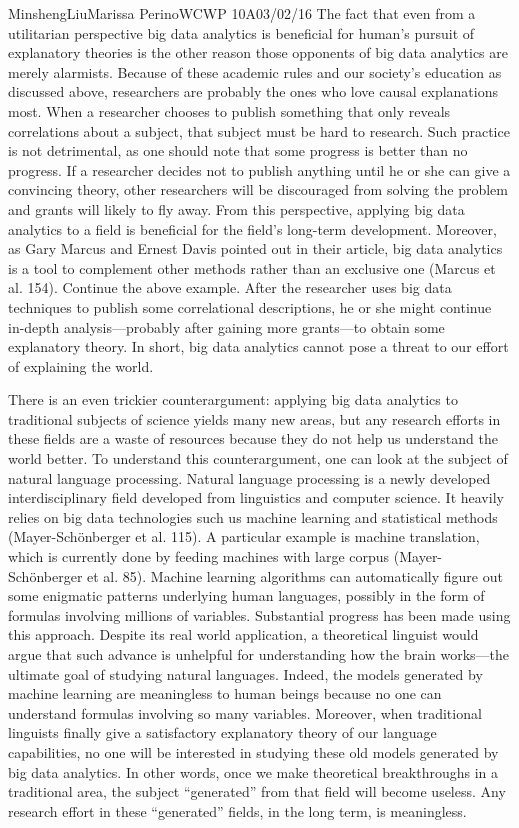 \documentclass[12pt,letterpaper]{article}
\begin{document}
\begin{mla}{Minsheng}{Liu}{Marissa Perino}{WCWP 10A}{03/02/16}
The fact that even from a utilitarian perspective big data analytics is
beneficial for human's pursuit of explanatory theories is the other
reason those opponents of big data analytics are merely alarmists.
Because of these academic rules and our society's education as discussed
above, researchers are probably the ones who love causal explanations
most. When a researcher chooses to publish something that only reveals
correlations about a subject, that subject must be hard to research.
Such practice is not detrimental, as one should note that some progress
is better than no progress. If a researcher decides not to publish
anything until he or she can give a convincing theory, other researchers
will be discouraged from solving the problem and grants will likely to
fly away. From this perspective, applying big data analytics to a field
is beneficial for the field's long-term development. Moreover, as Gary
Marcus and Ernest Davis pointed out in their article, big data analytics
is a tool to complement other methods rather than an exclusive one
(Marcus et al. 154). Continue the above example. After the researcher
uses big data techniques to publish some correlational descriptions, he
or she might continue in-depth analysis---probably after gaining more
grants---to obtain some explanatory theory. In short, big data analytics
cannot pose a threat to our effort of explaining the world.

There is an even trickier counterargument: applying big data analytics
to traditional subjects of science yields many new areas, but any
research efforts in these fields are a waste of resources because they
do not help us understand the world better. To understand this
counterargument, one can look at the subject of natural language
processing. Natural language processing is a newly developed
interdisciplinary field developed from linguistics and computer science.
It heavily relies on big data technologies such us machine learning and
statistical methods (Mayer-Schönberger et al. 115). A particular example
is machine translation, which is currently done by feeding machines with
large corpus (Mayer-Schönberger et al. 85). Machine learning algorithms
can automatically figure out some enigmatic patterns underlying human
languages, possibly in the form of formulas involving millions of
variables. Substantial progress has been made using this approach.
Despite its real world application, a theoretical linguist would argue
that such advance is unhelpful for understanding how the brain
works---the ultimate goal of studying natural languages. Indeed, the
models generated by machine learning are meaningless to human beings
because no one can understand formulas involving so many variables.
Moreover, when traditional linguists finally give a satisfactory
explanatory theory of our language capabilities, no one will be
interested in studying these old models generated by big data analytics.
In other words, once we make theoretical breakthroughs in a traditional
area, the subject ``generated'' from that field will become useless. Any
research effort in these ``generated'' fields, in the long term, is
meaningless.


\end{mla}
\end{document}
